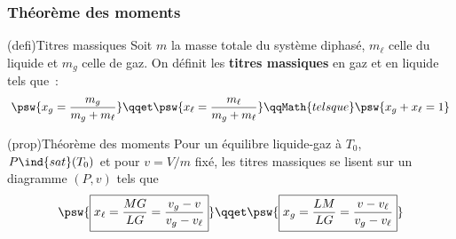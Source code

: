 \documentclass[../../main/main.tex]{subfiles}
\begin{document}
\subsubsection{Théorème des moments}

\begin{tcb*}(defi){Titres massiques}
	Soit $m$ la masse totale du système diphasé, $m_{\ell}$ celle du liquide et
	$m_g$ celle de gaz. On définit les \textbf{titres massiques} en gaz et en
	liquide tels que~:
	\[
		\psw{x_g = \frac{m_g}{m_g+m_{\ell}}}
		\qqet
		\psw{x_{\ell} = \frac{m_{\ell}}{m_g+m_{\ell}}}
		\qqMath{tels que}
		\psw{x_g + x_{\ell} = 1}
	\]
\end{tcb*}

\begin{tcb*}[sidebyside, lefthand ratio=.6](prop){Théorème des moments}
	Pour un équilibre liquide-gaz à $T_0$, $P\ind{sat}(T_0)$ et pour $v = V/m$
	fixé, les titres massiques se lisent sur un diagramme $(P,v)$ tels que
	\[
		\psw{\boxed{x_{\ell} = \frac{MG}{LG} = \frac{v_g - v}{v_g-v_{\ell}}}}
		\qqet
		\psw{\boxed{x_g = \frac{LM}{LG} = \frac{v - v_{\ell}}{v_g-v_{\ell}}}}
	\]
	\tcblower
	\begin{center}
		\vspace{-15pt}
	\end{center}
\end{tcb*}
\end{document}
